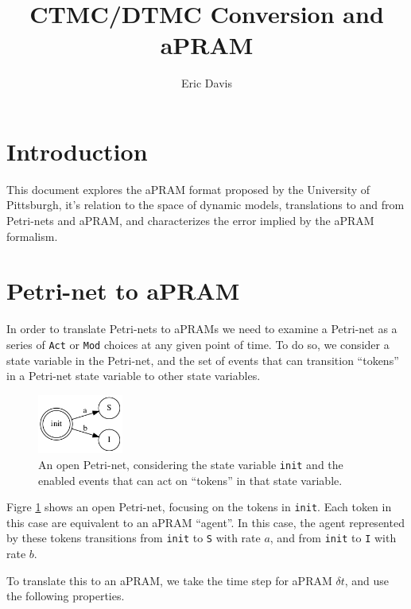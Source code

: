 \documentclass[12pt]{galois-whitepaper}
\author{Eric Davis}
\title{CTMC/DTMC Conversion and aPRAM}
\theoremstyle{plain}
\begin{document}
\maketitle

\vspace*{2cm}
\tableofcontents

\section{Introduction}

This document explores the aPRAM format proposed by the University of
Pittsburgh, it's relation to the space of dynamic models, translations
to and from Petri-nets and aPRAM, and characterizes the error implied
by the aPRAM formalism.

\section{Petri-net to aPRAM}

In order to translate Petri-nets to aPRAMs we need to examine a
Petri-net as a series of \texttt{Act} or \texttt{Mod} choices at any
given point of time.  To do so, we consider a state variable in the
Petri-net, and the set of events that can transition ``tokens'' in a
Petri-net state variable to other state variables.

\begin{figure}
  \centering
  \includegraphics[width=0.25\textwidth]{agent-single-move.png}
  \caption{An open Petri-net, considering the state variable
    \texttt{init} and the enabled events that can act on ``tokens'' in
    that state variable.}
  \label{Fig:Petri1}
\end{figure}

Figre \ref{Fig:Petri1} shows an open Petri-net, focusing on the tokens
in \texttt{init}.  Each token in this case are equivalent to an aPRAM
``agent''.  In this case, the agent represented by these tokens
transitions from \texttt{init} to \texttt{S} with rate $a$, and from
\texttt{init} to \texttt{I} with rate $b$.

To translate this to an aPRAM, we take the time step for aPRAM $\delta
t$, and use the following properties.
\end{document}
